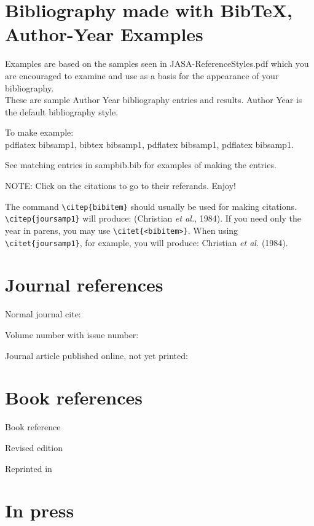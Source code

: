 \documentclass[preprint]{JASA}
\begin{document}
\section*{Bibliography made with BibTeX, Author-Year Examples}

Examples are based on the samples seen in JASA-ReferenceStyles.pdf which you
are encouraged to examine and use as a basis for the appearance of
your bibliography.\\
These are sample Author Year bibliography entries and results.
Author Year is the default bibliography style.

To make example:\\
 pdflatex bibsamp1, bibtex bibsamp1, pdflatex bibsamp1, pdflatex
 bibsamp1.

 See matching entries in sampbib.bib for examples of making the entries.

NOTE: Click on the citations to go to their referands. Enjoy!

The command \verb+\citep{bibitem}+ should usually be used for making
citations. \verb+\citep{joursamp1}+ will produce: (Christian {\it et
al.}, 1984). If you need only the year in parens, you may use
\verb+\citet{<bibitem>}+. When using \verb+\citet{joursamp1}+, for
example, you will produce: Christian {\it et al.} (1984).

\section*{Journal references}

Normal journal cite: \citep{joursamp1}

Volume number with issue number: \citep{joursamp3}


Journal article published online, not yet printed: \citep[published
online]{sampMisc2}

\section*{Book references}

Book reference \citep{booksamp1}

Revised edition \citep{booksamp4}

Reprinted in \citep{sampReprint2}

\section*{In press}

\citep[in press]{inpress2}
\end{document}
